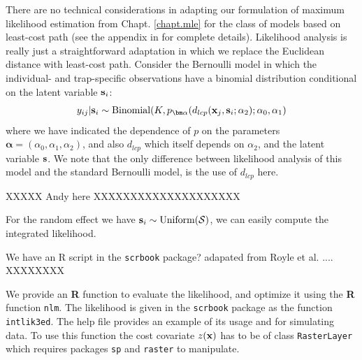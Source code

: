 There are no technical considerations in adapting our formulation of
maximum likelihood estimation \citep{borchers_efford:2008} from
Chapt. \ref{chapt.mle} for the class of models based on least-cost
path (see the appendix in \citet{royle_etal:2012ecol} for complete details).
Likelihood analysis is really just a straightforward adaptation in which we
replace the Euclidean distance with least-cost path.  Consider the
Bernoulli model in which the individual- and trap-specific
observations have a binomial distribution conditional on the latent
variable ${\bf s}_{i}$:
\begin{equation}
  y_{ij}| {\bf s}_{i} \sim \mbox{Binomial}(K, p_{\bm \alpha}(d_{lcp}({\bf x}_{j},{\bf s}_{i};\alpha_{2}); \alpha_{0}, \alpha_{1})
\label{ecoldist.eq.cond-on-s}
\end{equation}
where we have indicated the dependence of $p$ on the parameters
${\bm \alpha} =(\alpha_{0},\alpha_{1},\alpha_{2})$, and also $d_{lcp}$ which
itself depends on $\alpha_{2}$, and the latent variable ${\bf s}$.
We note that the only difference between likelihood analysis of this
model and the standard Bernoulli model, is the use of $d_{lcp}$ here. 


XXXXX Andy here XXXXXXXXXXXXXXXXXXXX

For the random effect we have ${\bf s}_{i} \sim  \mbox{Uniform}({\cal
  S})$, we can easily compute the integrated likelihood.

We have an R script in the \mbox{\tt scrbook} package?
adapated from Royle et al. .... XXXXXXXX

We provide an {\bf R} function to evaluate the likelihood, and
optimize it 
using the {\bf R} function \mbox{\tt nlm}.
The likelihood is given in the {\tt scrbook} package as the function
\mbox{\tt intlik3ed}. The help file
provides an example of its usage and for simulating data.
To use this function the cost covariate $z({\bf x})$ has to be of class
\mbox{\tt RasterLayer} which requires packages \mbox{\tt sp} and
\mbox{\tt raster} to manipulate.


